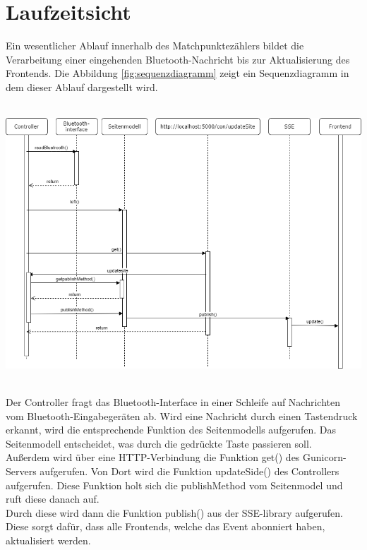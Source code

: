 \chapter{Laufzeitsicht}
Ein wesentlicher Ablauf innerhalb des Matchpunktezählers bildet die Verarbeitung einer eingehenden Bluetooth-Nachricht bis zur Aktualisierung des Frontends. Die Abbildung \ref{fig:sequenzdiagramm}  zeigt ein Sequenzdiagramm in dem dieser Ablauf dargestellt wird.  \\   \\
\begin{minipage}{\textwidth} 
	\centering
	\includegraphics[width=\textwidth]{Bilder/Sequenzdiagramm.png}\\
	\label{fig:sequenzdiagramm}
\end{minipage}
\\[0.5cm]
Der Controller fragt das Bluetooth-Interface in einer Schleife auf Nachrichten vom Bluetooth-Eingabegeräten ab. Wird eine Nachricht durch einen Tastendruck erkannt, wird die entsprechende Funktion des Seitenmodells aufgerufen. Das Seitenmodell entscheidet, was durch die gedrückte Taste passieren soll.\\   
Außerdem wird über eine HTTP-Verbindung die Funktion get() des Gunicorn-Servers aufgerufen. Von Dort wird die Funktion updateSide() des Controllers aufgerufen. Diese Funktion holt sich die publishMethod vom Seitenmodel und ruft diese danach auf.\\
Durch diese wird dann die Funktion publish() aus der SSE-library aufgerufen. Diese sorgt dafür, dass alle Frontends, welche das Event abonniert haben, aktualisiert werden.    